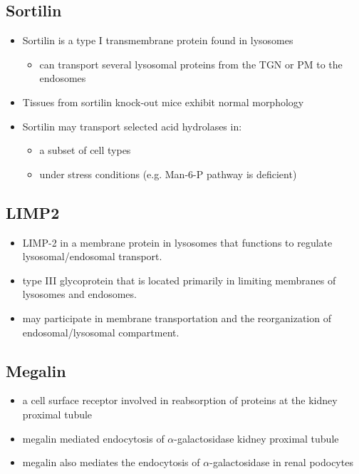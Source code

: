 \documentclass{scrartcl}
\begin{document}
\subsection{Sortilin}
\label{sec:orgf189dbc}
\begin{itemize}
\item Sortilin is a type I transmembrane protein found in lysosomes
\begin{itemize}
\item can transport several lysosomal proteins from the TGN or PM to the endosomes
\end{itemize}
\item Tissues from sortilin knock-out mice exhibit normal morphology
\item Sortilin may transport selected acid hydrolases in:
\begin{itemize}
\item a subset of cell types
\item under stress conditions (e.g. Man-6-P pathway is deficient)
\end{itemize}
\end{itemize}

\subsection{LIMP2}
\label{sec:org45c994d}
\begin{itemize}
\item LIMP-2 in a membrane protein in lysosomes that functions to regulate lysosomal/endosomal transport.
\item type III glycoprotein that is located primarily in limiting membranes of lysosomes and endosomes.
\item may participate in membrane transportation and the reorganization of endosomal/lysosomal compartment.
\end{itemize}

\subsection{Megalin}
\label{sec:orgdd9306d}
\begin{itemize}
\item a cell surface receptor involved in reabsorption of proteins at the kidney proximal tubule
\item megalin mediated endocytosis of \(\alpha\)-galactosidase kidney proximal tubule
\item megalin also mediates the endocytosis of \(\alpha\)-galactosidase in renal podocytes
\end{itemize}
\end{document}
